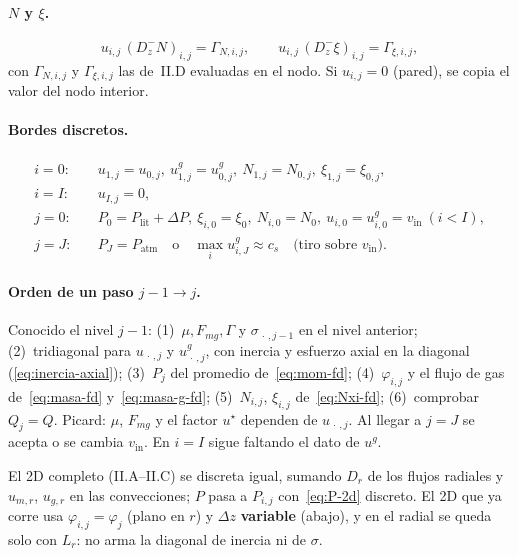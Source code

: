 \documentclass[11pt,a4paper]{article}
\begin{document}
\paragraph{$N$ y $\xi$.}
\begin{equation}
\label{eq:Nxi-fd}
u_{i,j}\,(D_z^- N)_{i,j}
=\Gamma_{N,i,j},
\qquad
u_{i,j}\,(D_z^- \xi)_{i,j}
=\Gamma_{\xi,i,j},
\end{equation}
con $\Gamma_{N,i,j}$ y $\Gamma_{\xi,i,j}$ las de~II.D
evaluadas en el nodo. Si $u_{i,j}=0$ (pared), se copia
el valor del nodo interior.

\paragraph{Bordes discretos.}
\begin{equation}
\label{eq:bc-fd}
\begin{aligned}
i=0:&\quad
u_{1,j}=u_{0,j},\ 
u^g_{1,j}=u^g_{0,j},\ 
N_{1,j}=N_{0,j},\ 
\xi_{1,j}=\xi_{0,j},
\\
i=I:&\quad
u_{I,j}=0,
\\
j=0:&\quad
P_0=P_{\mathrm{lit}}+\Delta P,\ 
\xi_{i,0}=\xi_0,\ 
N_{i,0}=N_0,\ 
u_{i,0}=u^g_{i,0}=v_{\mathrm{in}}\ (i<I),
\\
j=J:&\quad
P_J=P_{\mathrm{atm}}
\quad\text{o}\quad
\max_i u^g_{i,J}\approx c_s
\quad\text{(tiro sobre }v_{\mathrm{in}}\text{)}.
\end{aligned}
\end{equation}

\paragraph{Orden de un paso $j-1\to j$.}
Conocido el nivel $j-1$: (1)~$\mu,F_{mg},\Gamma$ y
$\sigma_{\,\cdot\,,j-1}$ en el nivel anterior;
(2)~tridiagonal para $u_{\,\cdot\,,j}$ y $u^g_{\,\cdot\,,j}$,
con inercia y esfuerzo axial en la diagonal
(\eqref{eq:inercia-axial});
(3)~$P_j$ del promedio de~\eqref{eq:mom-fd};
(4)~$\varphi_{i,j}$ y el flujo de gas de~\eqref{eq:masa-fd}
y~\eqref{eq:masa-g-fd};
(5)~$N_{i,j}$, $\xi_{i,j}$ de~\eqref{eq:Nxi-fd};
(6)~comprobar $Q_j=Q$.
Picard: $\mu$, $F_{mg}$ y el factor $u^\star$ dependen de
$u_{\,\cdot\,,j}$. Al llegar a $j=J$ se acepta o se
cambia $v_{\mathrm{in}}$. En $i=I$ sigue faltando el dato
de $u^g$.

El 2D completo (II.A--II.C) se discreta igual, sumando
$D_r$ de los flujos radiales y $u_{m,r}$, $u_{g,r}$ en las
convecciones; $P$ pasa a $P_{i,j}$ con~\eqref{eq:P-2d}
discreto. El 2D que ya corre usa $\varphi_{i,j}=\varphi_j$
(plano en $r$) y $\Delta z$ \textbf{variable} (abajo), y en
el radial se queda solo con $L_r$: no arma la diagonal de
inercia ni de $\sigma$.
\end{document}
